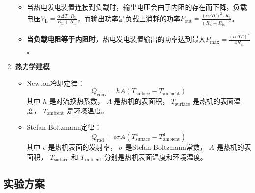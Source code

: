 \documentclass[dvipsnames, svgnames,a4paper,11pt]{article}
\begin{document}
\begin{enumerate}
\begin{itemize}
                    \item 当热电发电装置连接到负载时，输出电压会由于内阻的存在而下降。负载电压$V_{\text{L}} = \frac{\alpha \Delta T \cdot R_{\text{L}}}{R_{\text{L}} + R_{\text{in}}}$，而输出功率是负载上消耗的功率$P_{\text{out}} = \frac{(\alpha \Delta T)^2 \cdot R_{\text{L}}}{(R_{\text{L}} + R_{\text{in}})^2}$。
                    
                    \item \textbf{当负载电阻等于内阻时}，热电发电装置输出的功率达到最大$P_{\text{max}} = \frac{(\alpha \Delta T)^2}{4 R_{\text{in}}}$。				
                \end{itemize}


            \item \textbf{热力学建模}
            \begin{itemize}
                \item Newton冷却定律：
                \[
                Q_{\text{conv}} = h A (T_{\text{surface}} - T_{\text{ambient}})
                \]
                其中 \( h \) 是对流换热系数， \( A \) 是热机的表面积， \( T_{\text{surface}} \) 是热机的表面温度， \( T_{\text{ambient}} \) 是环境温度。
                
                \item Stefan-Boltzmann定律：
                \[
                Q_{\text{rad}} = \epsilon \sigma A (T_{\text{surface}}^4 - T_{\text{ambient}}^4)
                \]
                其中 \( \epsilon \) 是热机表面的发射率， \( \sigma \) 是Stefan-Boltzmann常数， \( A \) 是热机的表面积， \( T_{\text{surface}} \) 和 \( T_{\text{ambient}} \) 分别是热机表面温度和环境温度。
            \end{itemize}

      \end{enumerate}








    \subsection{实验方案}
    
            
\end{document}
